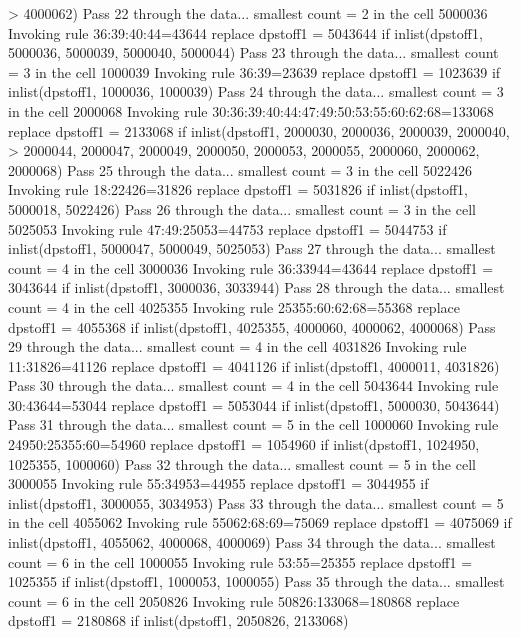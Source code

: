>  4000062)
Pass 22 through the data...
  smallest count = 2 in the cell      5000036
  Invoking rule 36:39:40:44=43644
  replace dpstoff1 = 5043644 if inlist(dpstoff1, 5000036, 5000039, 5000040, 5000044)
Pass 23 through the data...
  smallest count = 3 in the cell      1000039
  Invoking rule 36:39=23639
  replace dpstoff1 = 1023639 if inlist(dpstoff1, 1000036, 1000039)
Pass 24 through the data...
  smallest count = 3 in the cell      2000068
  Invoking rule 30:36:39:40:44:47:49:50:53:55:60:62:68=133068
  replace dpstoff1 = 2133068 if inlist(dpstoff1, 2000030, 2000036, 2000039, 2000040,
>  2000044, 2000047, 2000049, 2000050, 2000053, 2000055, 2000060, 2000062, 2000068)
Pass 25 through the data...
  smallest count = 3 in the cell      5022426
  Invoking rule 18:22426=31826
  replace dpstoff1 = 5031826 if inlist(dpstoff1, 5000018, 5022426)
Pass 26 through the data...
  smallest count = 3 in the cell      5025053
  Invoking rule 47:49:25053=44753
  replace dpstoff1 = 5044753 if inlist(dpstoff1, 5000047, 5000049, 5025053)
Pass 27 through the data...
  smallest count = 4 in the cell      3000036
  Invoking rule 36:33944=43644
  replace dpstoff1 = 3043644 if inlist(dpstoff1, 3000036, 3033944)
Pass 28 through the data...
  smallest count = 4 in the cell      4025355
  Invoking rule 25355:60:62:68=55368
  replace dpstoff1 = 4055368 if inlist(dpstoff1, 4025355, 4000060, 4000062, 4000068)
Pass 29 through the data...
  smallest count = 4 in the cell      4031826
  Invoking rule 11:31826=41126
  replace dpstoff1 = 4041126 if inlist(dpstoff1, 4000011, 4031826)
Pass 30 through the data...
  smallest count = 4 in the cell      5043644
  Invoking rule 30:43644=53044
  replace dpstoff1 = 5053044 if inlist(dpstoff1, 5000030, 5043644)
Pass 31 through the data...
  smallest count = 5 in the cell      1000060
  Invoking rule 24950:25355:60=54960
  replace dpstoff1 = 1054960 if inlist(dpstoff1, 1024950, 1025355, 1000060)
Pass 32 through the data...
  smallest count = 5 in the cell      3000055
  Invoking rule 55:34953=44955
  replace dpstoff1 = 3044955 if inlist(dpstoff1, 3000055, 3034953)
Pass 33 through the data...
  smallest count = 5 in the cell      4055062
  Invoking rule 55062:68:69=75069
  replace dpstoff1 = 4075069 if inlist(dpstoff1, 4055062, 4000068, 4000069)
Pass 34 through the data...
  smallest count = 6 in the cell      1000055
  Invoking rule 53:55=25355
  replace dpstoff1 = 1025355 if inlist(dpstoff1, 1000053, 1000055)
Pass 35 through the data...
  smallest count = 6 in the cell      2050826
  Invoking rule 50826:133068=180868
  replace dpstoff1 = 2180868 if inlist(dpstoff1, 2050826, 2133068)
